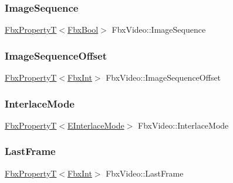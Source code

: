 \subsubsection{\texorpdfstring{Image\+Sequence}{ImageSequence}}
{\footnotesize\ttfamily \hyperlink{class_fbx_property_t}{Fbx\+PropertyT}$<$\hyperlink{fbxtypes_8h_a92e0562b2fe33e76a242f498b362262e}{Fbx\+Bool}$>$ Fbx\+Video\+::\+Image\+Sequence}

\mbox{\label{class_fbx_video_acc7a05788def81e3b7b1cb3d003021fb}} 
\subsubsection{\texorpdfstring{Image\+Sequence\+Offset}{ImageSequenceOffset}}
{\footnotesize\ttfamily \hyperlink{class_fbx_property_t}{Fbx\+PropertyT}$<$\hyperlink{fbxtypes_8h_a088fa96de3b0b3ea69f0f6afef525dfb}{Fbx\+Int}$>$ Fbx\+Video\+::\+Image\+Sequence\+Offset}

\mbox{\label{class_fbx_video_a624969738a09268e8897cffbe94e5188}} 
\subsubsection{\texorpdfstring{Interlace\+Mode}{InterlaceMode}}
{\footnotesize\ttfamily \hyperlink{class_fbx_property_t}{Fbx\+PropertyT}$<$\hyperlink{class_fbx_video_a1e60229c28a15e29289f3f00b23aa215}{E\+Interlace\+Mode}$>$ Fbx\+Video\+::\+Interlace\+Mode}

\mbox{\label{class_fbx_video_a30d7edd0fc1e23268702f5811327e526}} 
\subsubsection{\texorpdfstring{Last\+Frame}{LastFrame}}
{\footnotesize\ttfamily \hyperlink{class_fbx_property_t}{Fbx\+PropertyT}$<$\hyperlink{fbxtypes_8h_a088fa96de3b0b3ea69f0f6afef525dfb}{Fbx\+Int}$>$ Fbx\+Video\+::\+Last\+Frame}

